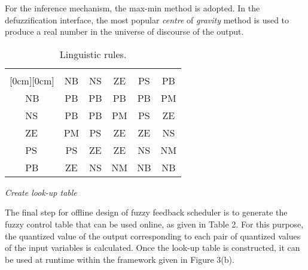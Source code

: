 \documentclass[12pt,a4paper]{ijicic}
\begin{document}
\begin{asparaenum}
For the inference mechanism, the max-min method is adopted. In the
defuzzification interface, the most popular \emph{centre} of
\emph{gravity} method is used to produce a real number in the
universe of discourse of the output.
\begin{table}[htb!]
\centering
\tabcolsep 3mm
\caption{Linguistic rules.}
\label{table:1}
\begin{center}
\begin{tabular}[b]{|l|l|c|c|c|c|c|}\hline
\multicolumn{2}{|c|}{}
&\multicolumn{5}{c|}{\parbox{8mm}{}} \\\cline{3-7}
\multicolumn{2}{|c|}{\raisebox{1.5ex}[0cm][0cm]{\parbox{5mm}{}}} & \parbox{5mm}{NB} & \parbox{5mm}{NS} & \parbox{5mm}{ZE} & \parbox{5mm}{PS} & \parbox{5mm}{PB} \\\hline
{}
& \parbox{5mm}{NB} & \parbox{5mm}{PB} & \parbox{5mm}{PB} & \parbox{5mm}{PB} & \parbox{5mm}{PB} & \parbox{5mm}{PM}  \\ 
& \parbox{5mm}{NS} & \parbox{5mm}{PB} & \parbox{5mm}{PB} & \parbox{5mm}{PM} & \parbox{5mm}{PS} & \parbox{5mm}{ZE}  \\ 
& \parbox{5mm}{ZE} & \parbox{5mm}{PM} & \parbox{5mm}{PS} & \parbox{5mm}{ZE} & \parbox{5mm}{ZE} & \parbox{5mm}{NS} \\ 
& \parbox{5mm}{PS} & \parbox{5mm}{PS} & \parbox{5mm}{ZE} & \parbox{5mm}{ZE} & \parbox{5mm}{NS} & \parbox{5mm}{NM} \\ 
& \parbox{5mm}{PB} & \parbox{5mm}{ZE} & \parbox{5mm}{NS} & \parbox{5mm}{NM} & \parbox{5mm}{NB} & \parbox{5mm}{NB} \\\hline
\end{tabular}
\end{center}
\end{table}

\item \emph{Create look-up table}

The final step for offline design of fuzzy feedback scheduler is to generate the
fuzzy control table that can be used online, as given in Table 2.
For this purpose, the quantized value of the output corresponding to
each pair of quantized values of the input variables is calculated. Once
the look-up table is constructed, it can be used at runtime within the framework
given in Figure 3(b).


\end{asparaenum}
\end{document}
